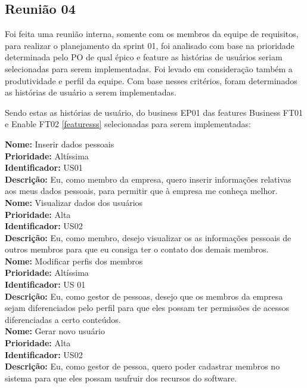 \subsection{Reunião 04}
Foi feita uma reunião interna, somente com os membros da equipe de requisitos, para realizar o planejamento da sprint 01, foi analisado com base na prioridade determinada pelo PO de qual épico e feature as histórias de usuários seriam selecionadas para serem implementadas. Foi levado em consideração também a produtividade e perfil da equipe. Com base nesses critérios, foram determinados as histórias de usuário a serem implementadas. 

Sendo estas as histórias de usuário, do business EP01 das features Business FT01 e Enable FT02 \ref{featuresss} selecionadas para serem implementadas: 

 \indent \textbf{Nome:} Inserir dados pessoais\\
 \indent \textbf{Prioridade:} Altíssima\\
 \indent \textbf{Identificador:} US01\\
 \indent \textbf{Descrição:} Eu, como membro da empresa, quero inserir informações relativas aos meus dados pessoais, para permitir que à empresa me conheça melhor.\\

 \indent \textbf{Nome:} Visualizar dados dos usuários\\
 \indent \textbf{Prioridade:} Alta\\
 \indent \textbf{Identificador:} US02\\
 \indent \textbf{Descrição:} Eu, como membro, desejo visualizar os as informações pessoais de outros membros para que eu consiga ter o contato dos demais membros.\\

 \indent \textbf{Nome:} Modificar perfis dos membros\\
 \indent \textbf{Prioridade:} Altíssima\\
 \indent \textbf{Identificador:} US 01\\
 \indent \textbf{Descrição:} Eu, como gestor de pessoas, desejo que os membros da empresa sejam diferenciados pelo perfil para que eles possam ter permissões de acessos diferenciadas a certo conteúdos.\\

 \indent \textbf{Nome:} Gerar novo usuário\\
 \indent \textbf{Prioridade:} Alta\\
 \indent \textbf{Identificador:} US02\\
 \indent \textbf{Descrição:} Eu, como gestor de pessoa, quero poder cadastrar membros no sistema para que eles possam usufruir dos recursos do software.\\
             
